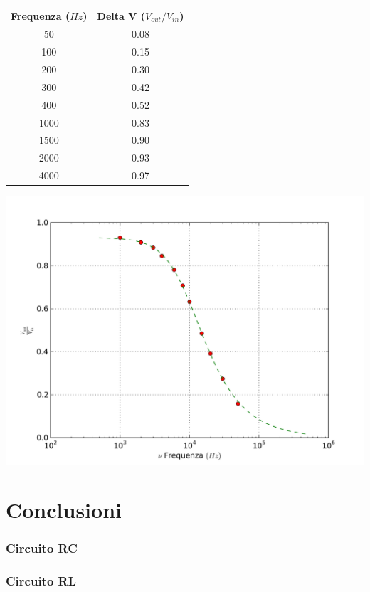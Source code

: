\begin{center}
\begin{tabular}{*{2}{c}}
Frequenza ($Hz$) & Delta V ($V_{out}/V_{in}$) \\
\midrule
50 & 0.08 \\
100 & 0.15 \\
200 & 0.30 \\
300 & 0.42 \\
400 & 0.52 \\
1000 & 0.83 \\
1500 & 0.90 \\
2000 & 0.93 \\
4000 & 0.97 \\
\end{tabular}
\end{center}
\begin{center}
 \includegraphics[scale=0.50]{grafici/C3/ddpindu.png}
\end{center}

\section{Conclusioni}
\subsubsection{Circuito RC}
\subsubsection{Circuito RL}
